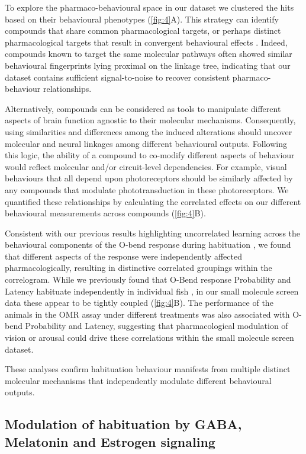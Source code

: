 \documentclass[9pt,lineno]{RandlettLab_elife}
\begin{document}
To explore the pharmaco-behavioural space in our dataset we clustered the hits based on their behavioural phenotypes (\autoref{fig:4}A). This strategy can identify compounds that share common pharmacological targets, or perhaps distinct pharmacological targets that result in convergent behavioural effects \citep{Bruni2016-nq, Rihel2010-pj}. Indeed, compounds known to target the same molecular pathways often showed similar behavioural fingerprints lying proximal on the linkage tree, indicating that our dataset contains sufficient signal-to-noise to recover consistent pharmaco-behaviour relationships. 

Alternatively, compounds can be considered as tools to manipulate different aspects of brain function agnostic to their molecular mechanisms. Consequently, using similarities and differences among the induced alterations should uncover molecular and neural linkages among different behavioural outputs. Following this logic, the ability of a compound to co-modify different aspects of behaviour would reflect molecular and/or circuit-level dependencies. For example, visual behaviours that all depend upon photoreceptors should be similarly affected by any compounds that modulate phototransduction in these photoreceptors. We quantified these relationships by calculating the correlated effects on our different behavioural measurements across compounds (\autoref{fig:4}B). 

Consistent with our previous results highlighting uncorrelated learning across the behavioural components of the O-bend response during habituation \citep{Randlett2019-fi}, we found that different aspects of the response were independently affected pharmacologically, resulting in distinctive correlated groupings within the correlogram. While we previously found that O-Bend response Probability and Latency habituate independently in individual fish \citep{Randlett2019-fi}, in our small molecule screen data these appear to be tightly coupled (\autoref{fig:4}B). The performance of the animals in the OMR assay under different treatments was also associated with O-bend Probability and Latency, suggesting that pharmacological modulation of vision or arousal could drive these correlations within the small molecule screen dataset.

These analyses confirm habituation behaviour manifests from multiple distinct molecular mechanisms that independently modulate different behavioural outputs.

\subsection{Modulation of habituation by GABA, Melatonin and Estrogen signaling}
\vspace{3mm}
\end{document}
